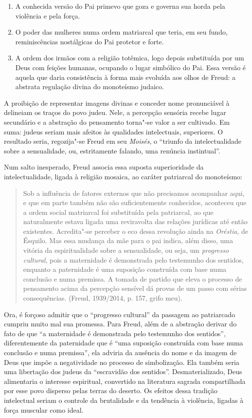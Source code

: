\begin{enumerate}
\def\labelenumi{\arabic{enumi})}
\item
  A conhecida versão do Pai primevo que goza e governa sua horda pela
  violência e pela força.
\item
  O poder das mulheres numa ordem matriarcal que teria, em seu fundo,
  reminiscências nostálgicas do Pai protetor e forte.
\item
  A ordem dos irmãos com a religião totêmica, logo depois substituída
  por um Deus com feições humanas, ocupando o lugar simbólico do Pai.
  Essa versão é aquela que daria consistência à forma mais evoluída aos
  olhos de Freud: a abstrata regulação divina do monoteísmo judaico.
\end{enumerate}

A proibição de representar imagens divinas e conceder nome pronunciável
à  delineiam os traços do povo judeu. Nele, a percepção sensória
recebe lugar secundário e a abstração do pensamento torna"-se valor a ser
cultivado. Em suma: judeus seriam mais afeitos às qualidades
intelectuais, superiores. O resultado seria, regozija"-se Freud em seu
\emph{Moisés}, o ``triunfo da intelectualidade sobre a sensualidade, ou,
estritamente falando, uma renúncia instintual''.

Num salto inesperado, Freud associa essa suposta superioridade da
intelectualidade, ligada à religião mosaica, ao caráter patriarcal do
monoteísmo:

\begin{quote}
Sob a influência de fatores externos que não precisamos acompanhar aqui,
e que em parte também não são suficientemente conhecidos, aconteceu que
a ordem social matriarcal foi substituída pela patriarcal, ao que
naturalmente estava ligada uma reviravolta das relações jurídicas até
então existentes. Acredita"-se perceber o eco dessa revolução ainda na
\emph{Oréstia}, de Ésquilo. Mas essa mudança da mãe para o pai indica,
além disso, uma vitória da espiritualidade sobre a sensualidade, ou
seja, um \emph{progresso cultural}, pois a maternidade é demonstrada
pelo testemunho dos sentidos, enquanto a paternidade é uma suposição
construída com base numa conclusão e numa premissa. A tomada de partido
que eleva o processo de pensamento acima da percepção sensível dá provas
de um passo com sérias consequências. (Freud, 1939/2014, p. 157, grifo
meu).
\end{quote}

Ora, é forçoso admitir que o ``progresso cultural'' da passagem ao
patriarcado cumpriu muito mal sua promessa. Para Freud, além de a
abstração derivar do fato de que ``a maternidade é demonstrada pelo
testemunho dos sentidos'', diferentemente da paternidade que é ``uma
suposição construída com base numa conclusão e numa premissa'', ela
adviria da ausência do nome e da imagem de Deus que impõe a negatividade
no processo de simbolização. Ela também seria uma libertação dos judeus
da ``escravidão dos sentidos''. Desmaterializado, Deus alimentaria o
interesse espiritual, convertido na literatura sagrada compartilhada por
esse povo disperso pelas terras do deserto. Os efeitos dessa tradição
intelectual seriam o controle da brutalidade e da tendência à violência,
ligadas à força muscular como ideal.

